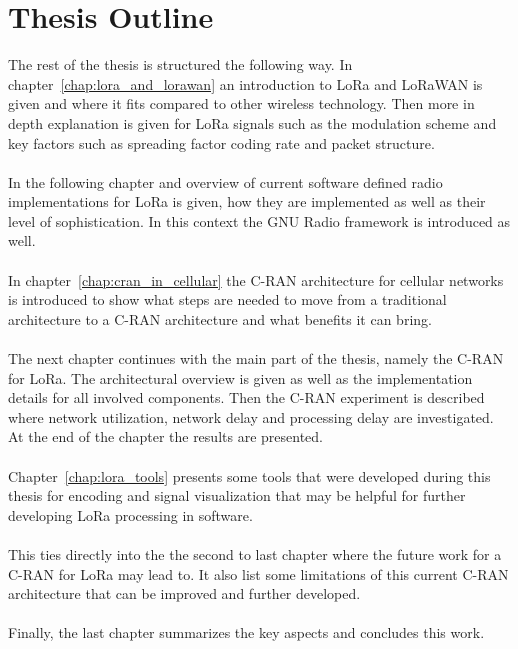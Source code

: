 \section{Thesis Outline}
The rest of the thesis is structured the following way.
In chapter~\ref{chap:lora_and_lorawan} an introduction to LoRa and 
LoRaWAN is given and where it fits compared to other wireless technology. 
Then more in depth explanation is given for LoRa signals such as the modulation scheme and key 
factors such as spreading factor coding rate and packet structure.
\\
\\
In the following chapter and overview of current software defined radio implementations for LoRa is given,
how they are implemented as well as their level of sophistication. In this context the GNU Radio 
framework is introduced as well.
\\
\\
In chapter~\ref{chap:cran_in_cellular} the C-RAN architecture for cellular networks 
is introduced to show what steps are needed to move from a traditional architecture to a C-RAN architecture
and what benefits it can bring. 
\\
\\
The next chapter continues with the main part of the thesis, namely the C-RAN for LoRa. 
The architectural overview is given as well as the implementation details for all 
involved components. Then the C-RAN experiment is described where 
network utilization, network delay and processing delay are investigated.
At the end of the chapter the results are presented.
\\
\\
Chapter~\ref{chap:lora_tools} presents some tools that were developed 
during this thesis for encoding and signal visualization that may be helpful
for further developing LoRa processing in software.
\\
\\
This ties directly into the the second to last chapter where the future work 
for a C-RAN for LoRa may lead to. It also list some limitations of this current 
C-RAN architecture that can be improved and further developed.
\\
\\
Finally, the last chapter summarizes the key aspects and concludes this work.


